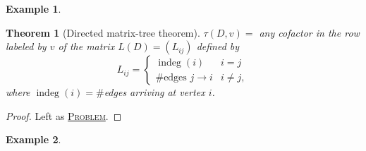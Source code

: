 \documentclass{report}
\newcommand{\fancyem}[1]{\underline{\textsc{#1}}}
\newtheorem{theorem}{Theorem}[section]
\theoremstyle{definition}
\newtheorem{example}{Example}[section]
\theoremstyle{remark}
\numberwithin{equation}{section}
\begin{document}
\begin{example}
    
\end{example}

\begin{theorem}[Directed matrix-tree theorem]
    $\tau(D, v) = $ any cofactor in the row labeled by $v$ of the matrix $L(D) = (L_{ij})$ defined by
    \[
        L_{ij} = \begin{cases}
            \operatorname{indeg}(i) & i = j \\
            \#\text{edges $j \to i$} & i \neq j,
        \end{cases}    
    \]
    where $\operatorname{indeg}(i) = \#$edges arriving at vertex $i$.
\end{theorem}
\begin{proof}
    Left as \fancyem{Problem}.
\end{proof}
\begin{example}
    
\end{example}
\end{document}
